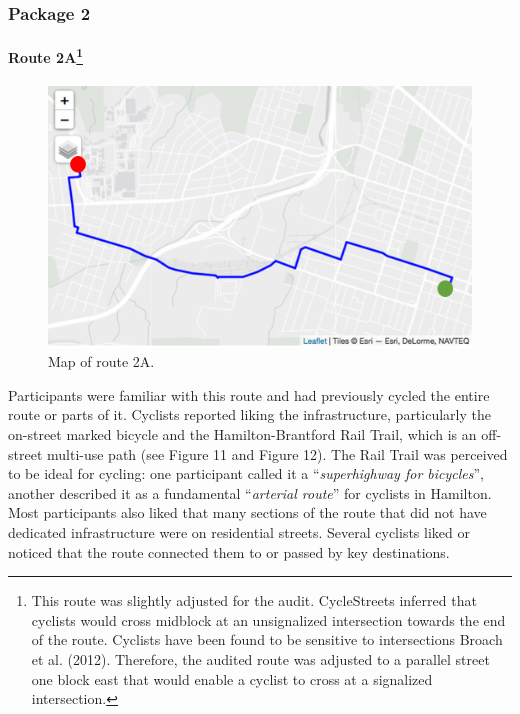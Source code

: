 \documentclass[]{elsarticle} %
\begin{document}
\hypertarget{package-2}{%
\subsubsection{Package 2}\label{package-2}}

\hypertarget{route-2a}{%
\paragraph[Route 2A]{\texorpdfstring{Route 2A\footnote{This route was
  slightly adjusted for the audit. CycleStreets inferred that cyclists
  would cross midblock at an unsignalized intersection towards the end
  of the route. Cyclists have been found to be sensitive to
  intersections Broach et al. (2012). Therefore, the audited route was
  adjusted to a parallel street one block east that would enable a
  cyclist to cross at a signalized intersection.}}{Route 2A}}\label{route-2a}}

\begin{figure}

{\centering \includegraphics[width=0.65\linewidth]{Route 2A} 

}

\caption{Map of route 2A.}\label{fig:figure-10}
\end{figure}

Participants were familiar with this route and had previously cycled the
entire route or parts of it. Cyclists reported liking the
infrastructure, particularly the on-street marked bicycle and the
Hamilton-Brantford Rail Trail, which is an off-street multi-use path
(see Figure 11 and Figure 12). The Rail Trail was perceived to be ideal
for cycling: one participant called it a ``\emph{superhighway for
bicycles}'', another described it as a fundamental ``\emph{arterial
route}'' for cyclists in Hamilton. Most participants also liked that
many sections of the route that did not have dedicated infrastructure
were on residential streets. Several cyclists liked or noticed that the
route connected them to or passed by key destinations.
\end{document}
